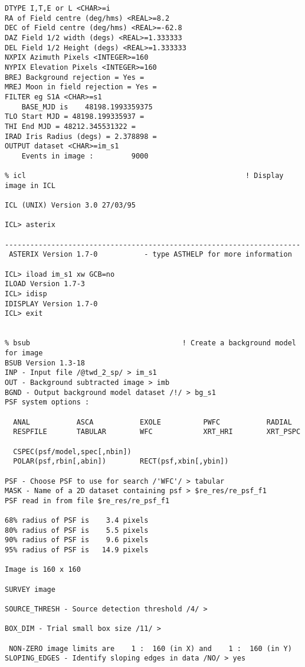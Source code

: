 \begin{small}
\begin{verbatim}
DTYPE I,T,E or L <CHAR>=i
RA of Field centre (deg/hms) <REAL>=8.2
DEC of Field centre (deg/hms) <REAL>=-62.8
DAZ Field 1/2 width (degs) <REAL>=1.333333
DEL Field 1/2 Height (degs) <REAL>=1.333333
NXPIX Azimuth Pixels <INTEGER>=160
NYPIX Elevation Pixels <INTEGER>=160
BREJ Background rejection = Yes =
MREJ Moon in field rejection = Yes =
FILTER eg S1A <CHAR>=s1
    BASE_MJD is    48198.1993359375     
TLO Start MJD = 48198.199335937 =
THI End MJD = 48212.345531322 =
IRAD Iris Radius (degs) = 2.378898 =
OUTPUT dataset <CHAR>=im_s1
    Events in image :         9000

% icl                                                    ! Display image in ICL

ICL (UNIX) Version 3.0 27/03/95

ICL> asterix

----------------------------------------------------------------------
 ASTERIX Version 1.7-0           - type ASTHELP for more information
 
ICL> iload im_s1 xw GCB=no
ILOAD Version 1.7-3
ICL> idisp
IDISPLAY Version 1.7-0
ICL> exit

	
% bsub                                    ! Create a background model for image
BSUB Version 1.3-18
INP - Input file /@twd_2_sp/ > im_s1
OUT - Background subtracted image > imb
BGND - Output background model dataset /!/ > bg_s1
PSF system options :

  ANAL           ASCA           EXOLE          PWFC           RADIAL
  RESPFILE       TABULAR        WFC            XRT_HRI        XRT_PSPC

  CSPEC(psf/model,spec[,nbin])
  POLAR(psf,rbin[,abin])        RECT(psf,xbin[,ybin])

PSF - Choose PSF to use for search /'WFC'/ > tabular
MASK - Name of a 2D dataset containing psf > $re_res/re_psf_f1
PSF read in from file $re_res/re_psf_f1

68% radius of PSF is    3.4 pixels
80% radius of PSF is    5.5 pixels
90% radius of PSF is    9.6 pixels
95% radius of PSF is   14.9 pixels

Image is 160 x 160

SURVEY image

SOURCE_THRESH - Source detection threshold /4/ > 

BOX_DIM - Trial small box size /11/ > 

 NON-ZERO image limits are    1 :  160 (in X) and    1 :  160 (in Y)
SLOPING_EDGES - Identify sloping edges in data /NO/ > yes


\end{verbatim}
\end{small}
